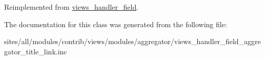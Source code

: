 Reimplemented from \hyperlink{classviews__handler__field_82ff951c5e9ceb97b2eab86f880cbc1e}{views\_\-handler\_\-field}.

The documentation for this class was generated from the following file:\begin{CompactItemize}
\item 
sites/all/modules/contrib/views/modules/aggregator/views\_\-handler\_\-field\_\-aggregator\_\-title\_\-link.inc\end{CompactItemize}
